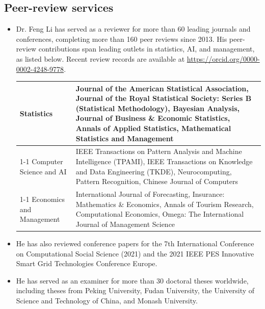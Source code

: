 \documentclass[twoside,a4paper]{article}
\begin{document}
\begin{refsection}
\printbibliography[heading=none]

\section{Peer-review services}

\begin{itemize}

\item Dr. Feng Li has served as a reviewer for more than 60 leading journals and conferences, completing more than 160 peer reviews since 2013. His peer-review contributions span leading outlets in statistics, AI, and management, as listed below. Recent review records are available at \url{https://orcid.org/0000-0002-4248-9778}.

  \begin{tabular}{lp{12cm}}
    \toprule
    Statistics &
                 Journal of the American Statistical Association,
                 Journal of the Royal Statistical Society: Series B (Statistical Methodology),
                 Bayesian Analysis,
                 Journal of Business \& Economic Statistics,
                 Annals of Applied Statistics,
                 Mathematical Statistics and Management \\
    \cline{1-1}
    Computer Science and AI &
                              IEEE Transactions on Pattern Analysis and Machine Intelligence (TPAMI),
                              IEEE Transactions on Knowledge and Data Engineering (TKDE),
                              Neurocomputing,
                              Pattern Recognition,
                              Chinese Journal of Computers\\
    \cline{1-1}
    Economics and Management &
                               International Journal of Forecasting,
                               Insurance: Mathematics \& Economics,
                               Annals of Tourism Research,
                               Computational Economics,
                               Omega: The International Journal of Management Science\\
    \bottomrule
  \end{tabular}

\item He has also reviewed conference papers for the 7th International Conference on Computational Social Science (2021) and the 2021 IEEE PES Innovative Smart Grid Technologies Conference Europe.

\item He has served as an examiner for more than 30 doctoral theses worldwide, including theses from Peking University, Fudan University, the University of Science and Technology of China, and Monash University.


\end{itemize}
\end{refsection}
\end{document}
